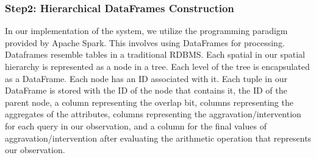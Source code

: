 


\subsubsection{Step2: Hierarchical DataFrames Construction}
In our implementation of the system, we utilize the programming paradigm provided by Apache Spark. This involves using DataFrames for processing. Dataframes resemble tables in a traditional RDBMS. Each spatial {\explanation} in our spatial hierarchy is represented as a node in a tree. Each level of the tree is encapsulated as a DataFrame. Each node has an ID associated with it. Each tuple in our DataFrame is stored with the ID of the node that contains it, the ID of the parent node, a column representing the overlap bit, columns representing the aggregates of the attributes, columns representing the aggravation/intervention for each query in our observation, and a column for the final values of aggravation/intervention after evaluating the arithmetic operation that represents our observation. 


